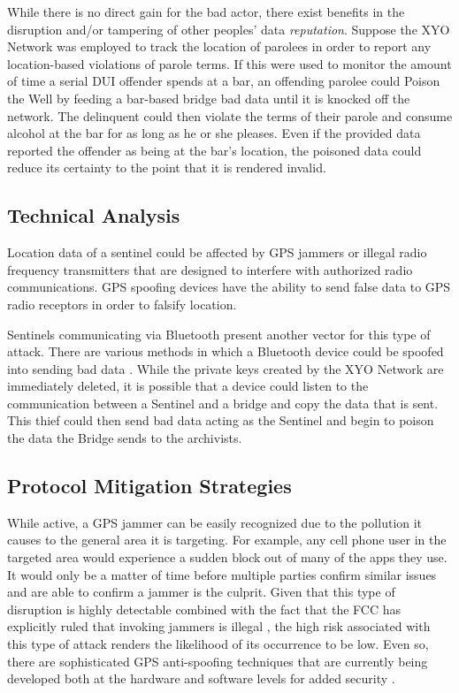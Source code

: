 \documentclass{article}
\begin{document}
While there is no direct gain for the bad actor, there exist benefits in the disruption and/or tampering of other peoples' data \textit{reputation}. Suppose the XYO Network was employed to track the location of parolees in order to report any location-based violations of parole terms. If this were used to monitor the amount of time a serial DUI offender spends at a bar, an offending parolee could Poison the Well by feeding a bar-based \Gls{bridge} bad data until it is knocked off the network. The delinquent could then violate the terms of their parole and consume alcohol at the bar for as long as he or she pleases. Even if the provided data reported the offender as being at the bar's location, the poisoned data could reduce its certainty to the point that it is rendered invalid.

\subsection{Technical Analysis}
Location data of a \Gls{sentinel} could be affected by GPS jammers or illegal radio frequency transmitters that are designed to interfere with authorized radio communications. GPS spoofing devices \cite{jafarina-gps} have the ability to send false data to GPS radio receptors in order to falsify location. 

Sentinels communicating via Bluetooth present another vector for this type of attack. There are various methods in which a Bluetooth device could be spoofed into sending bad data \cite{padgette-bluetooth}. While the private keys created by the XYO Network are immediately deleted, it is possible that a device could listen to the communication between a Sentinel and a \Gls{bridge} and copy the data that is sent. This thief could then send bad data acting as the Sentinel and begin to poison the data the Bridge sends to the \Glspl{archivist}. 

\subsection{Protocol Mitigation Strategies}
While active, a GPS jammer can be easily recognized due to the pollution it causes to the general area it is targeting. For example, any cell phone user in the targeted area would experience a sudden block out of many of the apps they use. It would only be a matter of time before multiple parties confirm similar issues and are able to confirm a jammer is the culprit. Given that this type of disruption is highly detectable combined with the fact that the FCC has explicitly ruled that invoking jammers is illegal \cite{chief-fcc}, the high risk associated with this type of attack renders the likelihood of its occurrence to be low. Even so, there are sophisticated GPS anti-spoofing techniques that are currently being developed both at the hardware and software levels for added security \cite{jafarina-gps}.
\end{document}
